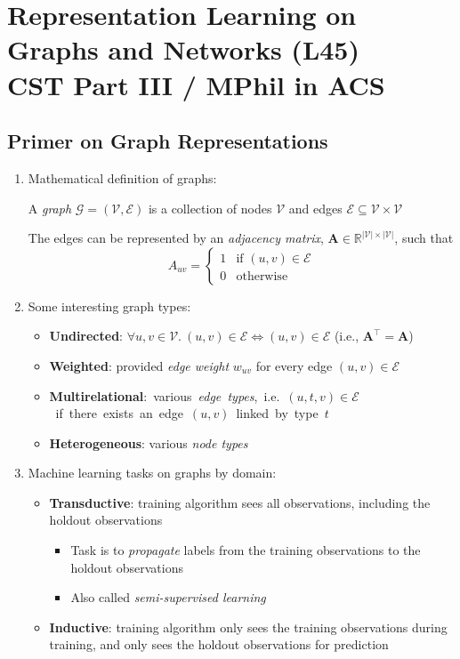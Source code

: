 \documentclass{article}
\author{Victor Zhao\\xz398@cam.ac.uk}
\begin{document}
\centering
\section*{Representation Learning on Graphs and Networks (L45)\\CST Part III / MPhil in ACS}
\MyAuthor

\justifying

\subsection{Primer on Graph Representations}

\begin{enumerate}
	\item Mathematical definition of graphs: 
	
	A \textit{graph} $\mathcal{G}=(\mathcal{V}, \mathcal{E})$ is a collection of nodes $\mathcal{V}$ and edges $\mathcal{E}\subseteq\mathcal{V}\times\mathcal{V}$
	
	The edges can be represented by an \textit{adjacency matrix}, $\mathbf{A}\in\mathbb{R}^{|\mathcal{V}|\times|\mathcal{V}|}$, such that
	$$A_{uv}=\begin{cases}
		1 &\text{if }(u,v)\in\mathcal{E}\\
		0 &\text{otherwise}
	\end{cases}$$

	\item Some interesting graph types:
	\begin{itemize}[topsep=0pt]
		\item \textbf{Undirected}: $\forall u, v\in\mathcal{V}.\ (u,v)\in\mathcal{E}\Longleftrightarrow (u,v)\in\mathcal{E}$ (i.e., $\mathbf{A}^\top=\mathbf{A}$)
		\item \textbf{Weighted}: provided \textit{edge weight} $w_{uv}$ for every edge $(u,v)\in\mathcal{E}$
		\item \textbf{Multirelational}:~various~\textit{edge~types},~i.e.~$(u,t,v)\in\mathcal{E}$~if~there~exists~an~edge~$(u,v)$~linked~by~type~$t$
		\item \textbf{Heterogeneous}: various \textit{node types}
	\end{itemize}

	\item Machine learning tasks on graphs by domain:
	\begin{itemize}[topsep=0pt]
		\item \textbf{Transductive}: training algorithm sees all observations, including the holdout observations
		\begin{itemize}[topsep=0pt]
			\item Task is to \textit{propagate} labels from the training observations to the holdout observations 
			\item Also called \textit{semi-supervised learning}
		\end{itemize}
		\item \textbf{Inductive}: training algorithm only sees the training observations during training, and only sees the holdout observations for prediction
	\end{itemize}


\end{enumerate}
\end{document}

